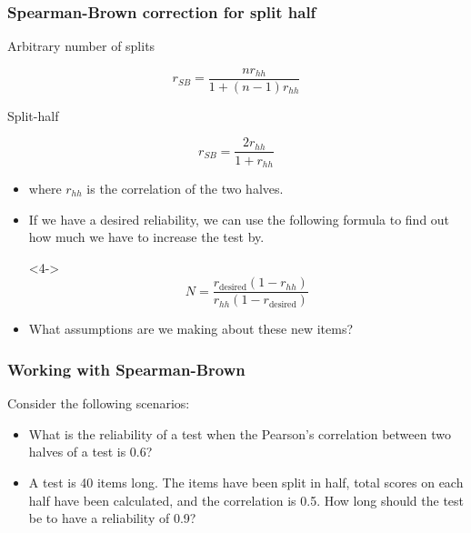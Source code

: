 \documentclass[dvipsnames]{beamer}\usepackage[]{graphicx}\usepackage[]{color}
\begin{document}
\begin{frame}
  \frametitle{Spearman-Brown correction for split half}
  \begin{center}
  Arbitrary number of splits
  
  $$r_{SB} = \frac{nr_{hh}}{1 + (n - 1)r_{hh}}$$
  
  Split-half
  
  $$r_{SB} = \frac{2r_{hh}}{1 + r_{hh}}$$
  \end{center}
  \begin{itemize}
    \item<2-> where $r_{hh}$ is the correlation of the two halves.
    \item<3-> If we have a desired reliability, we can use the following formula to find out how much we have to increase the test by.
    \item[]<4->$$N = \frac{r_{\text{desired}}(1 - r_{hh})}{r_{hh}(1 - r_{\text{desired}})}$$
    \item<5-> What assumptions are we making about these new items?
  \end{itemize}
\end{frame}

\begin{frame}
\frametitle{Working with Spearman-Brown}
Consider the following scenarios:
  \begin{itemize}
    \item<1-> What is the reliability of a test when the Pearson's correlation between two halves of a test is 0.6?
    \item<2-> A test is 40 items long. The items have been split in half, total scores on each half have been calculated, and the correlation is 0.5. How long should the test be to have a reliability of 0.9?
  \end{itemize}
\end{frame}
\end{document}

